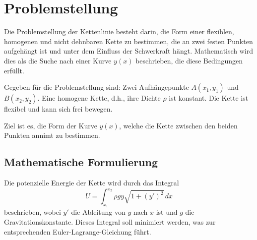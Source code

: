%
%
%
%
\section{Problemstellung\label{kettenlinie:section:Problemstellung}}
Die Problemstellung der Kettenlinie besteht darin, die Form einer flexiblen, homogenen und nicht dehnbaren Kette zu bestimmen, die an zwei festen Punkten aufgehängt ist und unter dem Einfluss der Schwerkraft hängt.
Mathematisch wird dies als die Suche nach einer Kurve \( y(x) \) beschrieben, die diese Bedingungen erfüllt. 

Gegeben für die Problemstellung sind: Zwei Aufhängepunkte \( A(x_1, y_1) \) und \( B(x_2, y_2) \).
Eine homogene Kette, d.h., ihre Dichte \( \rho \) ist konstant.
Die Kette ist flexibel und kann sich frei bewegen. 

Ziel ist es, die Form der Kurve \( y(x) \), welche die Kette zwischen den beiden Punkten annimt zu bestimmen.

\subsection{Mathematische Formulierung
\label{kettenlinie:subsection:Mathematische Formulierung}}
Die potenzielle Energie der Kette wird durch das Integral
\[
U = \int_{x_1}^{x_2} \rho g y \sqrt{1 + (y')^2} \, dx
\]
beschrieben, wobei \( y' \) die Ableitung von \( y \) nach \( x \) ist und \( g \) die Gravitationskonstante.
Dieses Integral soll minimiert werden, was zur entsprechenden Euler-Lagrange-Gleichung führt.


